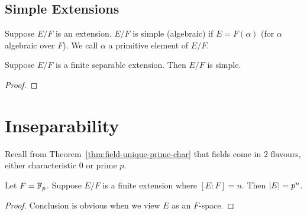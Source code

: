 \subsection*{Simple Extensions}

\begin{definition}
    Suppose \(E/F\) is an extension.
    \(E/F\) is simple (algebraic)
    if \(E = F(\alpha)\) (for \(\alpha\) algebraic over \(F\)).
    We call \(\alpha\) a primitive element of \(E/F\).
\end{definition}
\begin{theorem}\label{thm:primitive-element}
    Suppose \(E/F\) is a finite separable extension.
    Then \(E/F\) is simple.
\end{theorem}
\begin{proof}
\end{proof}


\section{Inseparability}

\begin{remark}
    Recall from Theorem~\ref{thm:field-unique-prime-char}
    that fields come in 2 flavours,
    either characteristic 0 or prime \(p\).
\end{remark}

\begin{proposition}\label{prop:finite-extension-finite-field}
    Let \(F = \mathbb{F}_p\).
    Suppose \(E/F\) is a finite extension where \([E:F] = n\).
    Then \(\abs{E} = p^n\).
\end{proposition}
\begin{proof}
    Conclusion is obvious when we view \(E\) as an \(F\)-space.
\end{proof}

